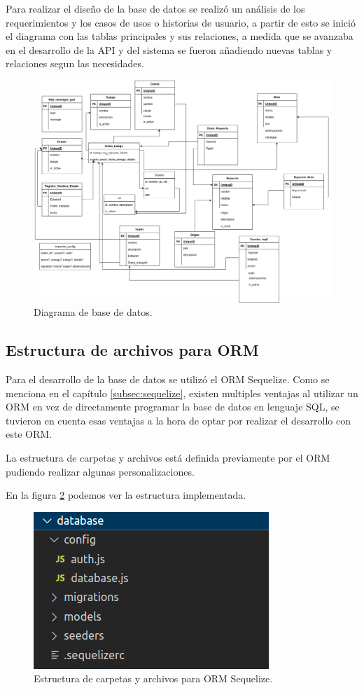 Para realizar el diseño de la base de datos se realizó un análisis de los requerimientos y los casos de usos o historias de usuario, a partir de esto se inició el diagrama con las tablas principales y sus relaciones, a medida que se avanzaba en el desarrollo de la API y del sistema  se fueron añadiendo nuevas tablas y relaciones segun las necesidades. 

\begin{figure}[h]
	\centering
	\includegraphics[scale=.27]{./Figures/diagramabbdd.png}
	\caption{Diagrama de base de datos.}
	\label{fig:diagramabbdd}
\end{figure}

\subsection{Estructura de archivos para ORM}
\label{subsec:estructuraorm}
Para el desarrollo de la base de datos se utilizó el ORM Sequelize. Como se menciona en el capítulo \ref{subsec:sequelize}, existen multiples ventajas al utilizar un ORM en vez de directamente programar la base de datos en lenguaje SQL, se tuvieron en cuenta esas ventajas a la hora de optar por realizar el desarrollo con este ORM. 

La estructura de carpetas y archivos está definida previamente por el ORM pudiendo realizar algunas personalizaciones. 

En la figura \ref{fig:estructuraorm} podemos ver la estructura implementada.

\begin{figure}[h]
	\centering
	\includegraphics[scale=.50]{./Figures/estructuraorm.png}
	\caption{Estructura de carpetas y archivos para ORM Sequelize.}
	\label{fig:estructuraorm}
\end{figure}

